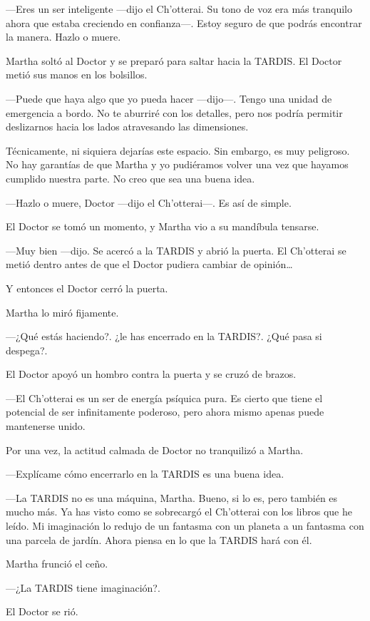 ---Eres un ser inteligente ---dijo el Ch'otterai. Su tono de voz era más tranquilo ahora que estaba creciendo en confianza---. Estoy seguro de que podrás encontrar la manera. Hazlo o muere.

Martha soltó al Doctor y se preparó para saltar hacia la TARDIS. El Doctor metió sus manos en los bolsillos.

---Puede que haya algo que yo pueda hacer ---dijo---. Tengo una unidad de emergencia a bordo. No te aburriré con los detalles, pero nos podría permitir deslizarnos hacia los lados atravesando las dimensiones.

Técnicamente, ni siquiera dejarías este espacio. Sin embargo, es muy peligroso. No hay garantías de que Martha y yo pudiéramos volver una vez que hayamos cumplido nuestra parte. No creo que sea una buena idea.

---Hazlo o muere, Doctor ---dijo el Ch'otterai---. Es así de simple.

El Doctor se tomó un momento, y Martha vio a su mandíbula tensarse.

---Muy bien ---dijo. Se acercó a la TARDIS y abrió la puerta. El Ch'otterai se metió dentro antes de que el Doctor pudiera cambiar de opinión\ldots{}

Y entonces el Doctor cerró la puerta.

Martha lo miró fijamente.

---¿Qué estás haciendo?. ¿le has encerrado en la TARDIS?. ¿Qué pasa si despega?.

El Doctor apoyó un hombro contra la puerta y se cruzó de brazos.

---El Ch'otterai es un ser de energía psíquica pura. Es cierto que tiene el potencial de ser infinitamente poderoso, pero ahora mismo apenas puede mantenerse unido.

Por una vez, la actitud calmada de Doctor no tranquilizó a Martha.

---Explícame cómo encerrarlo en la TARDIS es una buena idea.

---La TARDIS no es una máquina, Martha. Bueno, si lo es, pero también es mucho más. Ya has visto como se sobrecargó el Ch'otterai con los libros que he leído. Mi imaginación lo redujo de un fantasma con un planeta a un fantasma con una parcela de jardín. Ahora piensa en lo que la TARDIS hará con él.

Martha frunció el ceño.

---¿La TARDIS tiene imaginación?.

El Doctor se rió.


